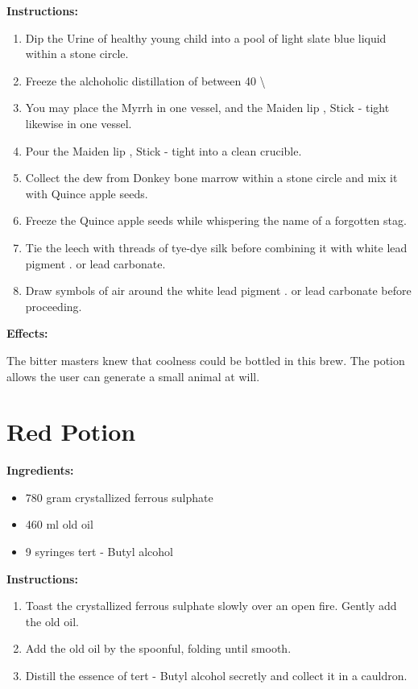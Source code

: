 \documentclass{article}
\begin{document}
\textbf{Instructions:}

\begin{enumerate}
  \item Dip the Urine of healthy young child into a pool of light slate blue liquid within a stone circle.
  \item Freeze the alchoholic distillation of between 40 \textbackslash{}%
  \item You may place the Myrrh in one vessel, and the Maiden lip , Stick - tight likewise in one vessel.
  \item Pour the Maiden lip , Stick - tight into a clean crucible.
  \item Collect the dew from Donkey bone marrow within a stone circle and mix it with Quince apple seeds.
  \item Freeze the Quince apple seeds while whispering the name of a forgotten stag.
  \item Tie the leech with threads of tye-dye silk before combining it with white lead pigment . or lead carbonate.
  \item Draw symbols of air around the white lead pigment . or lead carbonate before proceeding.
\end{enumerate}

\textbf{Effects:}

The bitter masters knew that coolness could be bottled in this brew. The potion allows the user can generate a small animal at will.

\newpage
\section*{Red Potion}

\textbf{Ingredients:}

\begin{itemize}
  \item 780 gram crystallized ferrous sulphate
  \item 460 ml old oil
  \item 9 syringes tert - Butyl alcohol
\end{itemize}

\textbf{Instructions:}

\begin{enumerate}
  \item Toast the crystallized ferrous sulphate slowly over an open fire. Gently add the old oil.
  \item Add the old oil by the spoonful, folding until smooth.
  \item Distill the essence of tert - Butyl alcohol secretly and collect it in a cauldron.
\end{enumerate}
\end{document}

